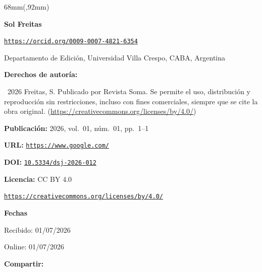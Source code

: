 \documentclass{article}
\newlength{\gbbloquex}
\begin{document}
\begin{textblock*}{68mm}(\gbbloquex,92mm)
{\setlength{\leftskip}{0pt}\setlength{\parindent}{0pt}%
\noindent\begin{minipage}[t]{68mm}
\sffamily\small\setlength{\parskip}{1pt}
{\bfseries\color{azulrevista}Sol Freitas}\par
{\scriptsize\texttt{\href{https://orcid.org/0009-0007-4821-6354}{https://orcid.org/0009-0007-4821-6354}}}\par
Departamento de Edición, Universidad Villa Crespo, CABA, Argentina\par
\vspace{6pt}
{\bfseries\color{azulrevista!70}Derechos de autor\'ia:}\par
\textcopyright\ 2026 Freitas, S. Publicado por Revista Soma. Se permite el uso, distribución y reproducción sin restricciones, incluso con fines comerciales, siempre que se cite la obra original. (\href{https://creativecommons.org/licenses/by/4.0/}{https://creativecommons.org/licenses/by/4.0/})\par\vspace{6pt}
{\bfseries\color{azulrevista!70}Publicación:} 2026, vol.~01, n\'um.~01, pp.~1--1\par\vspace{6pt}
{\bfseries\color{azulrevista!70}URL:} {\scriptsize\texttt{\href{https://www.google.com/}{https://www.google.com/}}}\par\vspace{6pt}
{\bfseries\color{azulrevista!70}DOI:} {\scriptsize\texttt{\href{https://doi.org/10.5334/dsj-2026-012}{10.5334/dsj-2026-012}}}\par\vspace{6pt}
{\bfseries\color{azulrevista!70}Licencia:} CC BY 4.0\par
{\scriptsize\texttt{\href{https://creativecommons.org/licenses/by/4.0/}{https://creativecommons.org/licenses/by/4.0/}}}\par
\vspace{6pt}
{\bfseries\color{azulrevista!70}Fechas}\par\vspace{2pt}
Recibido: 01/07/2026\par
Online: 01/07/2026\par
\vspace{6pt}
\vspace{6pt}
{\bfseries\color{azulrevista!70}Compartir:}\par\vspace{3pt}

\end{minipage}}
\end{textblock*}
\end{document}
